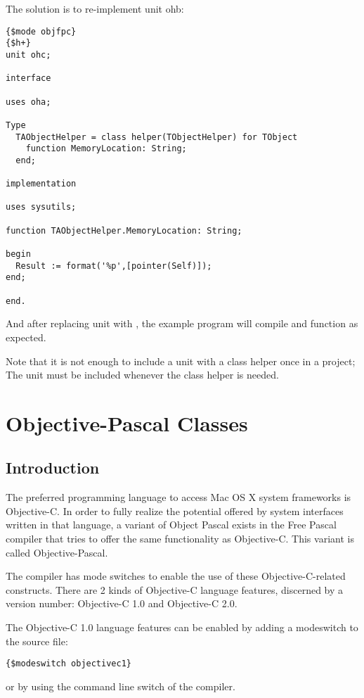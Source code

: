 The solution is to re-implement unit ohb:
\begin{verbatim}
{$mode objfpc}
{$h+}
unit ohc;

interface

uses oha;

Type
  TAObjectHelper = class helper(TObjectHelper) for TObject
    function MemoryLocation: String;
  end;
  
implementation

uses sysutils;
   
function TAObjectHelper.MemoryLocation: String;

begin
  Result := format('%p',[pointer(Self)]);
end;

end.     
\end{verbatim}
And after replacing unit  with , the example program will
compile and function as expected.

Note that it is not enough to include a unit with a class helper once in a
project; The unit must be included whenever the class helper is needed. 

\chapter{Objective-Pascal Classes}
\label{ch:ObjectivePascal}


\section{Introduction}
The preferred programming language to access Mac OS X system frameworks is
Objective-C. In order to fully realize the potential offered by system
interfaces written in that language, a variant of Object Pascal 
exists in the Free Pascal compiler that tries to offer the same
functionality as Objective-C. This variant is called Objective-Pascal. 

The compiler has mode switches to enable the use of these Objective-C-related
constructs. There are 2 kinds of Objective-C language features, discerned by
a version number: Objective-C 1.0 and Objective-C 2.0. 

The Objective-C 1.0 language features can be enabled by adding a modeswitch
to the source file:
\begin{verbatim}
{$modeswitch objectivec1}
\end{verbatim}
or by using the  command line switch of the compiler. 

